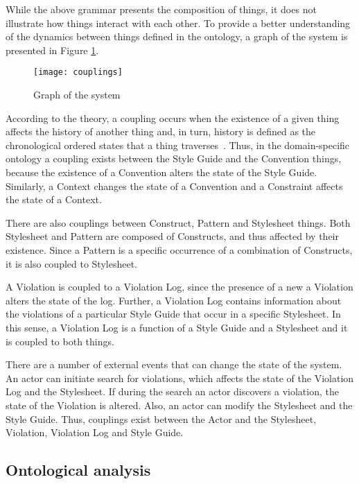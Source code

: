\documentclass[parskip=full]{uvamscse}
\begin{document}
While the above grammar presents the composition of things, it does not illustrate how things
interact with each other. To provide a better understanding of the dynamics between things defined
in the ontology, a graph of the system is presented in Figure \ref{fig:couplings}.

\begin{figure}[h!]
  \centering
  \caption{Graph of the system}
  \label{fig:couplings}
  \texttt{[image: couplings]}
\end{figure}

According to the theory, a coupling occurs when the existence of a given thing affects the history
of another thing and, in turn, history is defined as the chronological ordered states that a thing
traverses~\cite{wand1990ontological}. Thus, in the domain-specific ontology a coupling exists
between the Style Guide and the Convention things, because the existence of a Convention alters the
state of the Style Guide. Similarly, a Context changes the state of a Convention and a Constraint
affects the state of a Context.

There are also couplings between Construct, Pattern and Stylesheet things. Both Stylesheet and
Pattern are composed of Constructs, and thus affected by their existence. Since a Pattern is a
specific occurrence of a combination of Constructs, it is also coupled to Stylesheet.

A Violation is coupled to a Violation Log, since the presence of a new a Violation alters the state
of the log. Further, a Violation Log contains information about the violations of a particular Style
Guide that occur in a specific Stylesheet. In this sense, a Violation Log is a function of a Style
Guide and a Stylesheet and it is coupled to both things.

There are a number of external events that can change the state of the system. An actor can initiate
search for violations, which affects the state of the Violation Log and the Stylesheet. If during
the search an actor discovers a violation, the state of the Violation is altered. Also, an actor can
modify the Stylesheet and the Style Guide. Thus, couplings exist between the Actor and the
Stylesheet, Violation, Violation Log and Style Guide.

\subsection{Ontological analysis}
\end{document}
